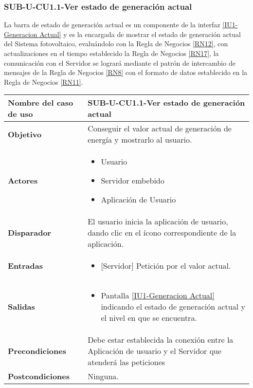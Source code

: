 \subsubsection{SUB-U-CU1.1-Ver estado de generación actual}\label{SUB-U-CU1.1}
La barra de estado de generación actual es un componente de la interfaz \hyperref[fig:monitoreo]{[IU1-Generacion Actual]} y es la encargada de mostrar el estado de generación actual del Sistema fotovoltaico, evaluándolo con la Regla de Negocios \ref{RN12}, con actualizaciones en el tiempo establecido la Regla de Negocios \ref{RN17}, la comunicación con el Servidor se logrará mediante el patrón de intercambio de mensajes de la Regla de Negocios \ref{RN8} con el formato de datos establecido en la Regla de Negocios \ref{RN11}.   
\begin{longtable}{|J{5cm}|J{10.3cm}|}
	\hline
	\textbf{Nombre del caso de uso} &
		SUB-U-CU1.1-Ver estado de generación actual \\ \hline
	\textbf{Objetivo} &
		Conseguir el valor actual de generación de energía y mostrarlo al usuario. \\ \hline
	\textbf{Actores} &
		\begin{itemize}
		    \item Usuario
			\item Servidor embebido
			\item Aplicación de Usuario
		\end{itemize} \\ \hline
	\textbf{Disparador} & 
	    El usuario inicia la aplicación de usuario, dando clic en el ícono correspondiente de la aplicación.\\ \hline 
	\textbf{Entradas} & 
		\begin{itemize}
				\item{[Servidor]} Petición por el valor actual.
		\end{itemize}\\ \hline 
	\textbf{Salidas} & 
		\begin{itemize}
			\item Pantalla \hyperref[fig:monitoreo]{[IU1-Generacion Actual]} indicando el estado de generación actual y el nivel en que se encuentra.
		\end{itemize} \\ \hline
	\textbf{Precondiciones} &
		Debe estar establecida la conexión entre la Aplicación de usuario y el Servidor que atenderá las peticiones \\ \hline
	\textbf{Postcondiciones} &
		Ninguna.\\ \hline

\end{longtable}
